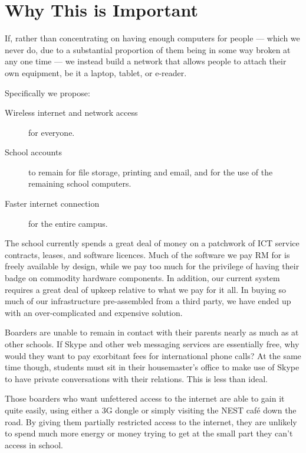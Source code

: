 \documentclass[a4paper,leqno,titlepage]{article}
\begin{document}
\break

\section{Why This is Important}


If, rather than concentrating on having enough computers for people --- which we
never do, due to a substantial proportion of them being in some way broken
at any one time --- we instead build a network that allows people to attach their
own equipment, be it a laptop, tablet, or e-reader.

Specifically we propose:
    
\begin{description}

\item[Wireless internet and network access] for everyone.
\item[School accounts] to remain for file storage, printing and email, and for
the use of the remaining school computers.
\item[Faster internet connection] for the entire campus.


\end{description}


The school currently spends a great deal of money on a patchwork of ICT
service contracts, leases, and software licences.
Much of the software we pay RM for is freely available by design, while we pay
too much for the privilege of having their badge on commodity hardware components.
In addition, our current system requires a great deal of upkeep relative to
what we pay for it all. In buying so much of our infrastructure pre-assembled
from a third party, we have ended up with an over-complicated and
expensive solution.


Boarders are unable to remain in contact with their parents nearly as much
as at other schools. If Skype and other web messaging services are essentially free, why
would they want to pay exorbitant fees for international phone calls?
At the same time though, students must sit in their housemaster's office to make
use of Skype to have private conversations with their relations.
This is less than ideal.


Those boarders who want unfettered access to the internet are
able to gain it quite easily, using either a 3G dongle or simply visiting the NEST
café down the road. By giving them partially restricted access to the internet,
they are unlikely to spend much more energy or money trying to get at the small part
they can't access in school.
\end{document}
